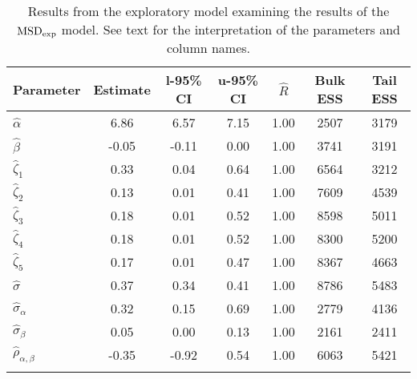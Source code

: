\begin{table}

\caption{Results from the exploratory model examining the results of the $\operatorname{MSD}_{\text{exp}}$ model. \label{tab:the exploratory-MSD}See text for the interpretation of the parameters and column names.}

\begin{tabular}{l *3{S[table-format=-1.2]} S[table-format=1.2] *2{S[table-format=5.0]}}
\lsptoprule
Parameter & {Estimate} & {l-95\% CI} & {u-95\% CI} & {$\hat{R}$} & {Bulk ESS} & {Tail ESS}\\
\midrule
$\hat\alpha$ & 6.86 & 6.57 & 7.15 & 1.00 & 2507 & 3179\\
$\hat\beta$ & -0.05 & -0.11 & 0.00 & 1.00 & 3741 & 3191\\
$\hat\zeta_{1}$ & 0.33 & 0.04 & 0.64 & 1.00 & 6564 & 3212\\
$\hat\zeta_{2}$ & 0.13 & 0.01 & 0.41 & 1.00 & 7609 & 4539\\
$\hat\zeta_{3}$ & 0.18 & 0.01 & 0.52 & 1.00 & 8598 & 5011\\
$\hat\zeta_{4}$ & 0.18 & 0.01 & 0.52 & 1.00 & 8300 & 5200\\
$\hat\zeta_{5}$ & 0.17 & 0.01 & 0.47 & 1.00 & 8367 & 4663\\
$\hat\sigma$ & 0.37 & 0.34 & 0.41 & 1.00 & 8786 & 5483\\
$\hat\sigma_{\alpha}$ & 0.32 & 0.15 & 0.69 & 1.00 & 2779 & 4136\\
$\hat\sigma_{\beta}$ & 0.05 & 0.00 & 0.13 & 1.00 & 2161 & 2411\\
$\hat\rho_{\alpha,\beta}$ & -0.35 & -0.92 & 0.54 & 1.00 & 6063 & 5421\\
\lspbottomrule
\end{tabular}

\end{table}






